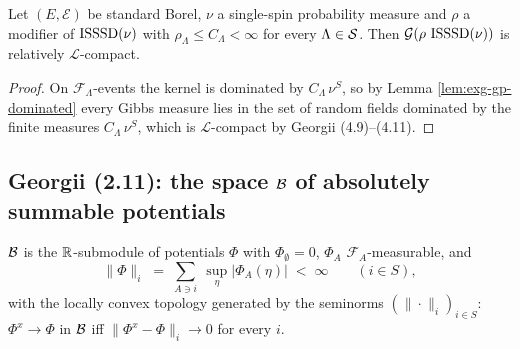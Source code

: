 \begin{example}
    \label{ex:exg-4-11-1}
    \leanok

    Let $(E,\mathcal E)$ be standard Borel, $\nu$ a single-spin probability measure and
    $\rho$ a modifier of $\operatorname{ISSSD}(\nu)$ with $\rho_\Lambda\le C_\Lambda<\infty$ for every
    $\Lambda\in\mathcal{S}$. Then $\mathcal{G}(\rho\,\operatorname{ISSSD}(\nu))$ is relatively $\mathcal L$-compact.
\end{example}
\begin{proof}
    \leanok

    On $\mathcal F_\Lambda$-events the kernel is dominated by $C_\Lambda\,\nu^S$, so by
    Lemma \ref{lem:exg-gp-dominated} every Gibbs measure lies in the set of random fields
    dominated by the finite measures $C_\Lambda\,\nu^S$, which is $\mathcal L$-compact by
    Georgii (4.9)--(4.11).
\end{proof}

\subsection*{Georgii (2.11): the space $\mathcal{B}$ of absolutely summable potentials}

\begin{definition}
    \label{def:exg-b-space}
    \leanok

    $\mathcal{B}$ is the $\mathbb{R}$-submodule of potentials $\Phi$ with $\Phi_\emptyset=0$, $\Phi_A$
    $\mathcal F_A$-measurable, and
    \[\|\Phi\|_i \;=\; \sum_{A\ni i}\ \sup_{\eta}|\Phi_A(\eta)| \;<\;\infty
      \qquad(i\in S),\]
    with the locally convex topology generated by the seminorms $(\|\cdot\|_i)_{i\in S}$:
    $\Phi^x\to\Phi$ in $\mathcal{B}$ iff $\|\Phi^x-\Phi\|_i\to0$ for every $i$.
\end{definition}

